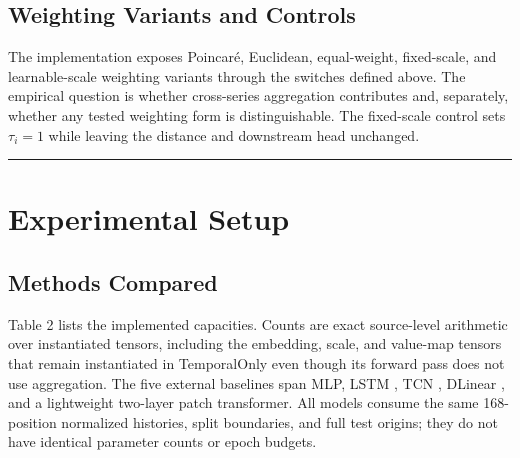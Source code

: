 \documentclass[electronics,article,submit,moreauthors]{Definitions/mdpi}
\begin{document}
\subsection{Weighting Variants and Controls}\label{weighting-variants-and-controls}

The implementation exposes Poincar\'{e}, Euclidean, equal-weight, fixed-scale, and learnable-scale weighting variants through the switches defined above. The empirical question is whether cross-series aggregation contributes and, separately, whether any tested weighting form is distinguishable. The fixed-scale control sets \(\tau_i=1\) while leaving the distance and downstream head unchanged.

\begin{center}\rule{0.5\linewidth}{0.5pt}\end{center}

\section{Experimental Setup}\label{experimental-setup}

\subsection{Methods Compared}\label{methods-compared}

Table 2 lists the implemented capacities. Counts are exact source-level arithmetic over instantiated tensors, including the embedding, scale, and value-map tensors that remain instantiated in TemporalOnly even though its forward pass does not use aggregation. The five external baselines span MLP, LSTM \cite{ref9,ref10}, TCN \cite{ref12}, DLinear \cite{ref5}, and a lightweight two-layer patch transformer. All models consume the same 168-position normalized histories, split boundaries, and full test origins; they do not have identical parameter counts or epoch budgets.
\end{document}
